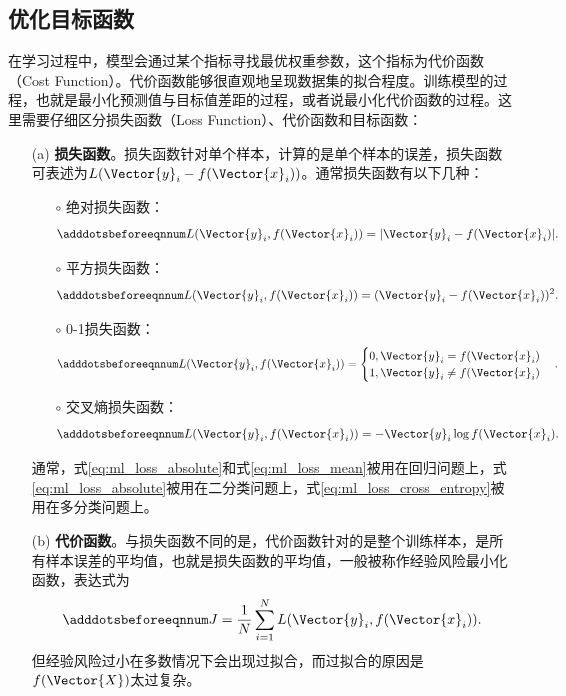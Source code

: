 \subsection{优化目标函数}\label{sec:ml_loss}

在学习过程中，模型会通过某个指标寻找最优权重参数，这个指标为代价函数（Cost Function）。代价函数能够很直观地呈现数据集的拟合程度。训练模型的过程，也就是最小化预测值与目标值差距的过程，或者说最小化代价函数的过程。这里需要仔细区分损失函数（Loss Function）、代价函数和目标函数：
\begin{itemize}
  \item[(a)] \textbf{损失函数}。损失函数针对单个样本，计算的是单个样本的误差，损失函数可表述为$L(\Vector{y}_i-f(\Vector{x}_i))$。通常损失函数有以下几种：
  \begin{enumerate}
    \item[$\circ$] 绝对损失函数：
    \begin{equation}\adddotsbeforeeqnnum
      \label{eq:ml_loss_absolute}
      L(\Vector{y}_i,f(\Vector{x}_i))=|\Vector{y}_i-f(\Vector{x}_i)|.
    \end{equation}
    \item[$\circ$] 平方损失函数：
    \begin{equation}\adddotsbeforeeqnnum
      \label{eq:ml_loss_mean}
      L(\Vector{y}_i,f(\Vector{x}_i))=(\Vector{y}_i-f(\Vector{x}_i))^2.
    \end{equation}
    \item[$\circ$] 0-1损失函数：
    \begin{equation}\adddotsbeforeeqnnum
      \label{eq:ml_loss_01}
      L(\Vector{y}_i,f(\Vector{x}_i))=
      \begin{cases}
        0, \Vector{y}_i=f(\Vector{x}_i)\\
        1, \Vector{y}_i\neq f(\Vector{x}_i)
      \end{cases}.
    \end{equation}
    \item[$\circ$] 交叉熵损失函数：
    \begin{equation}\adddotsbeforeeqnnum
      \label{eq:ml_loss_cross_entropy}
      L(\Vector{y}_i,f(\Vector{x}_i))=-\Vector{y}_i\log f(\Vector{x}_i).
    \end{equation}
  \end{enumerate}
  通常，式\ref{eq:ml_loss_absolute}和式\ref{eq:ml_loss_mean}被用在回归问题上，式\ref{eq:ml_loss_absolute}被用在二分类问题上，式\ref{eq:ml_loss_cross_entropy}被用在多分类问题上。

  \item[(b)] \textbf{代价函数}。与损失函数不同的是，代价函数针对的是整个训练样本，是所有样本误差的平均值，也就是损失函数的平均值，一般被称作经验风险最小化函数，表达式为
  \begin{equation}\adddotsbeforeeqnnum
    \label{eq:ml_loss_experience}
    J=\frac{1}{N}\sum_{i=1}^{N}L(\Vector{y}_i,f(\Vector{x}_i)).
  \end{equation}
  但经验风险过小在多数情况下会出现过拟合，而过拟合的原因是$f(\Vector{X})$太过复杂。


\end{itemize}
